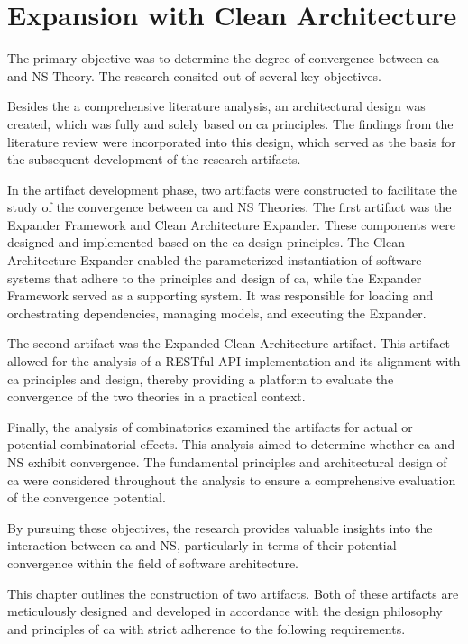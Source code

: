 \section{Expansion with Clean Architecture}

The primary objective was to determine the degree of convergence between \gls{ca} and NS
Theory. The research consited out of several key objectives.

Besides the a comprehensive literature analysis, an architectural design was created,
which was fully and solely based on \gls{ca} principles. The findings from the literature
review were incorporated into this design, which served as the basis for the subsequent
development of the research artifacts.

In the artifact development phase, two artifacts were constructed to facilitate the study
of the convergence between \gls{ca} and NS Theories. The first artifact was the Expander
Framework and Clean Architecture Expander. These components were designed and implemented
based on the \gls{ca} design principles. The Clean Architecture Expander enabled the
parameterized instantiation of software systems that adhere to the principles and design
of \gls{ca}, while the Expander Framework served as a supporting system. It was responsible for
loading and orchestrating dependencies, managing models, and executing the Expander.

The second artifact was the Expanded Clean Architecture artifact. This artifact allowed
for the analysis of a RESTful API implementation and its alignment with \gls{ca}
principles and design, thereby providing a platform to evaluate the convergence of the two
theories in a practical context.

Finally, the analysis of combinatorics examined the artifacts for actual or potential
combinatorial effects. This analysis aimed to determine whether \gls{ca} and NS exhibit
convergence. The fundamental principles and architectural design of \gls{ca} were
considered throughout the analysis to ensure a comprehensive evaluation of the convergence
potential.

By pursuing these objectives, the research provides valuable insights into the interaction
between \gls{ca} and NS, particularly in terms of their potential convergence within the field
of software architecture.

This chapter outlines the construction of two artifacts. Both of these artifacts are
meticulously designed and developed in accordance with the design philosophy and
principles of \gls{ca} with strict adherence to the following requirements.
